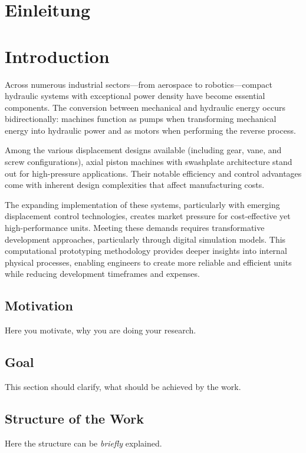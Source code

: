   {\chapter{Einleitung}}
  {\chapter{Introduction}}

\label{sec:introduction}
Across numerous industrial sectors—from aerospace to robotics—compact hydraulic systems with exceptional power density have become essential components. The conversion between mechanical and hydraulic energy occurs bidirectionally: machines function as pumps when transforming mechanical energy into hydraulic power and as motors when performing the reverse process.

\p Among the various displacement designs available (including gear, vane, and screw configurations), axial piston machines with swashplate architecture stand out for high-pressure applications. Their notable efficiency and control advantages come with inherent design complexities that affect manufacturing costs.

\p The expanding implementation of these systems, particularly with emerging displacement control technologies, creates market pressure for cost-effective yet high-performance units. Meeting these demands requires transformative development approaches, particularly through digital simulation models. This computational prototyping methodology provides deeper insights into internal physical processes, enabling engineers to create more reliable and efficient units while reducing development timeframes and expenses.
\section{Motivation}
Here you motivate, why you are doing your research.

\section{Goal}
This section should clarify, what should be achieved by the work.

\section{Structure of the Work}
Here the structure can be \emph{briefly} explained.


